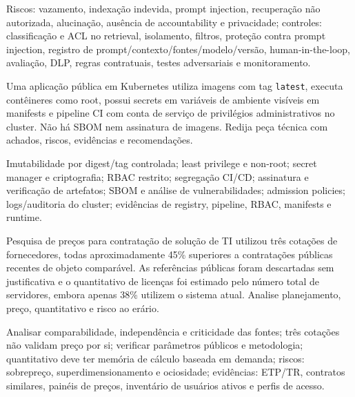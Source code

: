\begin{resumo}
Riscos: vazamento, indexação indevida, prompt injection, recuperação não autorizada, alucinação, ausência de accountability e privacidade; controles: classificação e ACL no retrieval, isolamento, filtros, proteção contra prompt injection, registro de prompt/contexto/fontes/modelo/versão, human-in-the-loop, avaliação, DLP, regras contratuais, testes adversariais e monitoramento.
\end{resumo}

\begin{discursiva}
Uma aplicação pública em Kubernetes utiliza imagens com tag \texttt{latest}, executa contêineres como root, possui secrets em variáveis de ambiente visíveis em manifests e pipeline CI com conta de serviço de privilégios administrativos no cluster. Não há SBOM nem assinatura de imagens. Redija peça técnica com achados, riscos, evidências e recomendações.
\end{discursiva}

\begin{resumo}
Imutabilidade por digest/tag controlada; least privilege e non-root; secret manager e criptografia; RBAC restrito; segregação CI/CD; assinatura e verificação de artefatos; SBOM e análise de vulnerabilidades; admission policies; logs/auditoria do cluster; evidências de registry, pipeline, RBAC, manifests e runtime.
\end{resumo}

\begin{discursiva}
Pesquisa de preços para contratação de solução de TI utilizou três cotações de fornecedores, todas aproximadamente 45\% superiores a contratações públicas recentes de objeto comparável. As referências públicas foram descartadas sem justificativa e o quantitativo de licenças foi estimado pelo número total de servidores, embora apenas 38\% utilizem o sistema atual. Analise planejamento, preço, quantitativo e risco ao erário.
\end{discursiva}

\begin{resumo}
Analisar comparabilidade, independência e criticidade das fontes; três cotações não validam preço por si; verificar parâmetros públicos e metodologia; quantitativo deve ter memória de cálculo baseada em demanda; riscos: sobrepreço, superdimensionamento e ociosidade; evidências: ETP/TR, contratos similares, painéis de preços, inventário de usuários ativos e perfis de acesso.
\end{resumo}

